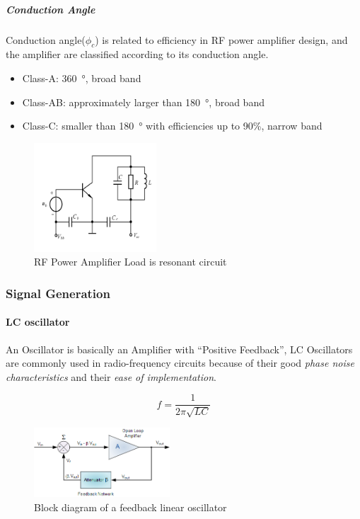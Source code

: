 \subparagraph{Conduction Angle} Conduction angle($\phi_c$) is related to efficiency in RF power amplifier design, and the amplifier are classified according to its conduction angle.

\begin{itemize}
  \item Class-A: \SI{360}{\degree}, broad band
  \item Class-AB: approximately larger than \SI{180}{\degree}, broad band
  \item Class-C: smaller than \SI{180}{\degree} with efficiencies up to 90\%, narrow band
\end{itemize}

\begin{figure}
  \centering
  \includegraphics[width=1.8in]{fig/fig_rf_power_amp.png}
  \caption{RF Power Amplifier Load is resonant circuit}\label{fig_rf_power_amp}
\end{figure}

\subsubsection{Signal Generation}

\paragraph{LC oscillator} An Oscillator is basically an Amplifier  with ``Positive Feedback'', LC Oscillators are commonly used in radio-frequency circuits because of their good \emph{phase noise characteristics} and their \emph{ease of implementation}.

$$f=\frac{1}{2\pi \sqrt{LC}}$$

\begin{figure}
  \centering
  \includegraphics[width=2.0in]{fig/osc35.png}
  \caption{Block diagram of a feedback linear oscillator}\label{osc_diag}
\end{figure}

